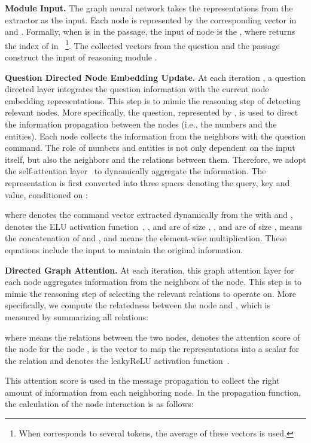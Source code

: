 \documentclass{article}
\begin{document}
{\bf Module Input.}
The graph neural network takes the representations from the extractor as the input.
Each node is represented by the corresponding vector in  and . 
Formally, when  is in the passage, the input of node  is the , where  returns the index of  in ~\footnote{When  corresponds to several tokens, the average of these vectors is used.}.
The collected vectors from the question and the passage construct the input of reasoning module .

{\bf Question Directed Node Embedding Update.}
At each iteration , a question directed layer integrates the question information with the current node embedding representations. This step is to mimic the reasoning step of detecting relevant nodes. More specifically, the question, represented by , is used to direct the information propagation between the nodes (i.e., the numbers and the entities).
Each node collects the information from the neighbors with the question command.
The role of numbers and entities is not only dependent on the input itself, but also the neighbors and the relations between them.
Therefore, we adopt the self-attention layer~\cite{vaswani2017attention} to dynamically aggregate the information.
The representation is first converted into three spaces denoting the query, key and value, conditioned on :

where  denotes the command vector extracted dynamically from the  with  and ,  denotes the ELU activation function~\cite{DBLP:journals/corr/ClevertUH15},
,  and  are of size , ,  and  are of size ,  means the concatenation of  and , and  means the element-wise multiplication.
These equations include the input  to maintain the original information.

{\bf Directed Graph Attention.} At each iteration, this graph attention layer for each node aggregates information from the neighbors of the node. This step is to mimic the reasoning step of selecting the relevant relations to operate on. 
More specifically, we compute the relatedness between the node  and , which is measured by summarizing all relations:

where  means the relations between the two nodes,  denotes the attention score of the node  for the node ,  is the vector to map the representations into a scalar for the relation  and  denotes the leakyReLU activation function~\cite{DBLP:journals/corr/XuWCL15}. 

This attention score is used in the message propagation to collect the right amount of information from each neighboring node.
In the propagation function, the calculation of the node interaction is as follows:
\end{document}
